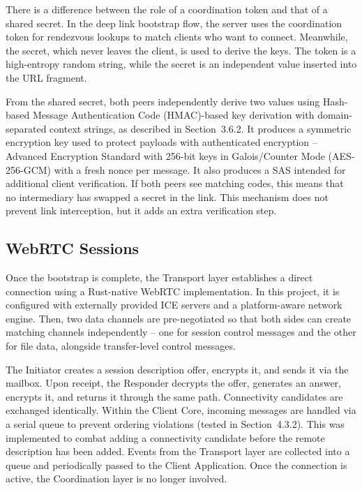 \documentclass[12pt,a4paper,oneside]{report}
\begin{document}
There is a difference between the role of a coordination token and that of a shared secret. In the deep link bootstrap flow, the server uses the coordination token for rendezvous lookups to match clients who want to connect. Meanwhile, the secret, which never leaves the client, is used to derive the keys. The token is a high-entropy random string, while the secret is an independent value inserted into the URL fragment.

From the shared secret, both peers independently derive two values using Hash-based Message Authentication Code (HMAC)-based key derivation with domain-separated context strings, as described in Section~3.6.2. It produces a symmetric encryption key used to protect payloads with authenticated encryption -- Advanced Encryption Standard with 256-bit keys in Galois/Counter Mode (AES-256-GCM) with a fresh nonce per message. It also produces a SAS intended for additional client verification. If both peers see matching codes, this means that no intermediary has swapped a secret in the link. This mechanism does not prevent link interception, but it adds an extra verification step.


\subsection{WebRTC Sessions}
\label{sec:webrtc-sessions}

Once the bootstrap is complete, the Transport layer establishes a direct connection using a Rust-native WebRTC implementation. In this project, it is configured with externally provided ICE servers and a platform-aware network engine. Then, two data channels are pre-negotiated so that both sides can create matching channels independently -- one for session control messages and the other for file data, alongside transfer-level control messages.

The Initiator creates a session description offer, encrypts it, and sends it via the mailbox. Upon receipt, the Responder decrypts the offer, generates an answer, encrypts it, and returns it through the same path. Connectivity candidates are exchanged identically. Within the Client Core, incoming messages are handled via a serial queue to prevent ordering violations (tested in Section~4.3.2). This was implemented to combat adding a connectivity candidate before the remote description has been added. Events from the Transport layer are collected into a queue and periodically passed to the Client Application. Once the connection is active, the Coordination layer is no longer involved.
\end{document}
